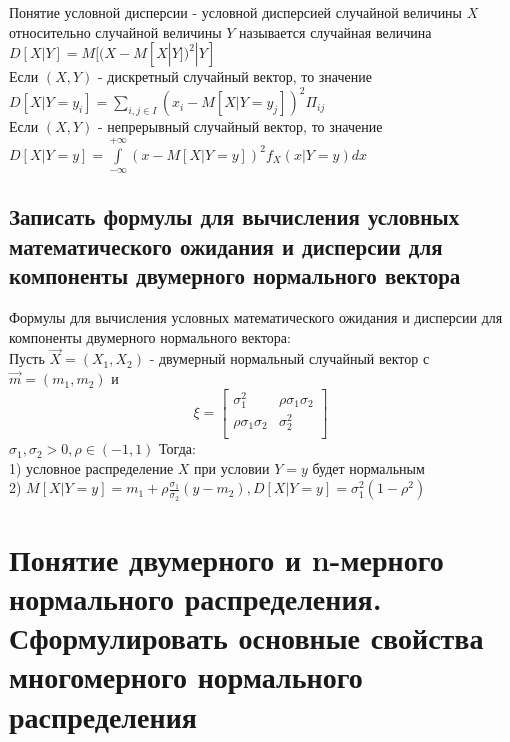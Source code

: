 Понятие условной дисперсии - условной дисперсией случайной величины $X$ относительно случайной величины $Y$ называется случайная величина $D[X | Y] = M[(X - M[X|Y])^{2} | Y]$\\
Если $(X, Y)$ - дискретный случайный вектор, то значение $D[X|Y = y_{i}] = \sum\limits_{i,j \in I}(x_{i} - M[X | Y = y_{j}])^{2} \Pi_{ij}$\\
Если $(X, Y)$ - непрерывный случайный вектор, то значение $D[X|Y = y] = \int\limits_{-\infty}^{+\infty} (x - M[X|Y = y])^{2} f_{X} (x | Y = y) dx$

\subsection{Записать формулы для вычисления условных математического ожидания и дисперсии для компоненты двумерного нормального вектора}
Формулы для вычисления условных математического ожидания и дисперсии для компоненты двумерного нормального вектора:\\
Пусть $\overrightarrow{X} = (X_{1}, X_{2})$ - двумерный нормальный случайный вектор с $\overrightarrow{m} = (m_{1}, m_{2})$ и\\
\begin{equation}
\xi = 
\left[
  \begin{array}{cc}
     \sigma_{1}^{2} & \rho \sigma_{1} \sigma_{2}\\
     \rho \sigma_{1} \sigma_{2} & \sigma_{2}^{2}\\
  \end{array}
\right]
\end{equation}
$\sigma_{1}, \sigma_{2} > 0, \rho \in (-1, 1)$
Тогда:\\
1) условное распределение $X$ при условии $Y = y$ будет нормальным\\
2) $M[X | Y = y] = m_{1} + \rho \frac{\sigma_{1}}{\sigma_{2}}(y - m_{2}), D[X | Y = y] = \sigma_{1}^{2}(1 - \rho^{2})$\\

\section{Понятие двумерного и n-мерного нормального распределения. Сформулировать основные свойства многомерного нормального распределения}

